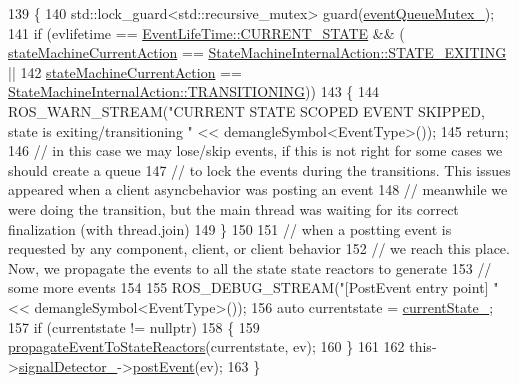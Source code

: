 \begin{DoxyCode}
139   \{
140     std::lock\_guard<std::recursive\_mutex> guard(\hyperlink{classsmacc_1_1ISmaccStateMachine_a492facb6acc13cf91c4eaf142abcd871}{eventQueueMutex\_});
141     \textcolor{keywordflow}{if} (evlifetime == \hyperlink{namespacesmacc_a5063f47926ad2fe25120ed4b1e7b2c7ea49b599d413671f16f08d0dd18243c294}{EventLifeTime::CURRENT\_STATE} && (
      \hyperlink{classsmacc_1_1ISmaccStateMachine_a654a98ba86c4c1013ac3c371f293d950}{stateMachineCurrentAction} == 
      \hyperlink{namespacesmacc_a0889aff43c93fe5285109819d2898144a22bd5bb7935dd66f181d92efc273951e}{StateMachineInternalAction::STATE\_EXITING} ||
142                                                        \hyperlink{classsmacc_1_1ISmaccStateMachine_a654a98ba86c4c1013ac3c371f293d950}{stateMachineCurrentAction} 
      == \hyperlink{namespacesmacc_a0889aff43c93fe5285109819d2898144a5e174e130ee1847f37541ba5786207a3}{StateMachineInternalAction::TRANSITIONING}))
143     \{
144       ROS\_WARN\_STREAM(\textcolor{stringliteral}{"CURRENT STATE SCOPED EVENT SKIPPED, state is exiting/transitioning "} << 
      demangleSymbol<EventType>());
145       \textcolor{keywordflow}{return};
146       \textcolor{comment}{// in this case we may lose/skip events, if this is not right for some cases we should create a queue}
147       \textcolor{comment}{// to lock the events during the transitions. This issues appeared when a client asyncbehavior was
       posting an event}
148       \textcolor{comment}{// meanwhile we were doing the transition, but the main thread was waiting for its correct
       finalization (with thread.join)}
149     \}
150 
151     \textcolor{comment}{// when a postting event is requested by any component, client, or client behavior}
152     \textcolor{comment}{// we reach this place. Now, we propagate the events to all the state state reactors to generate}
153     \textcolor{comment}{// some more events}
154 
155     ROS\_DEBUG\_STREAM(\textcolor{stringliteral}{"[PostEvent entry point] "} << demangleSymbol<EventType>());
156     \textcolor{keyword}{auto} currentstate = \hyperlink{classsmacc_1_1ISmaccStateMachine_a9c6e7745205bcce80a301f2fbe8f7e99}{currentState\_};
157     \textcolor{keywordflow}{if} (currentstate != \textcolor{keyword}{nullptr})
158     \{
159       \hyperlink{classsmacc_1_1ISmaccStateMachine_a3d369c7cff22632ca85a8656000ba19c}{propagateEventToStateReactors}(currentstate, ev);
160     \}
161 
162     this->\hyperlink{classsmacc_1_1ISmaccStateMachine_a3982eb671f5f001cb047d3a467789986}{signalDetector\_}->\hyperlink{classsmacc_1_1SignalDetector_a6ab99d99cef8d101e39797a72daeb2b7}{postEvent}(ev);
163   \}
\end{DoxyCode}
